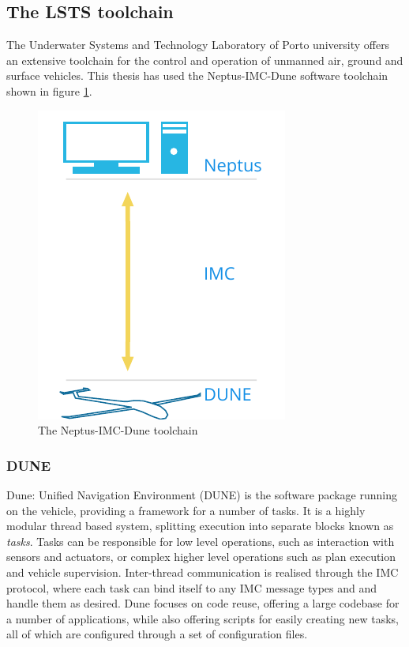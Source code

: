 
\subsection{The LSTS toolchain}
    The Underwater Systems and Technology Laboratory of Porto university offers an extensive toolchain for the control and operation of unmanned air, ground and surface vehicles. This thesis has used the Neptus-IMC-Dune software toolchain shown in figure \ref{fig:lsts-toolchain}.
    
    \begin{figure}[!htbp]
        \centering
        \includegraphics{bilder/lsts-toolchain.pdf}
        \caption{The Neptus-IMC-Dune toolchain}
        \label{fig:lsts-toolchain}
    \end{figure}
    \subsubsection{DUNE}
    Dune: Unified Navigation Environment (DUNE) is the software package running on the vehicle, providing a framework for a number of tasks. It is a highly modular thread based system, splitting execution into separate blocks known as \textit{tasks}. Tasks can be responsible for low level operations, such as interaction with sensors and actuators, or complex higher level operations such as plan execution and vehicle supervision. Inter-thread communication is realised through the IMC protocol, where each task can bind itself to any IMC message types and and handle them as desired. Dune focuses on code reuse, offering a large codebase for a number of applications, while also offering scripts for easily creating new tasks, all of which are configured through a set of configuration files. 
    
